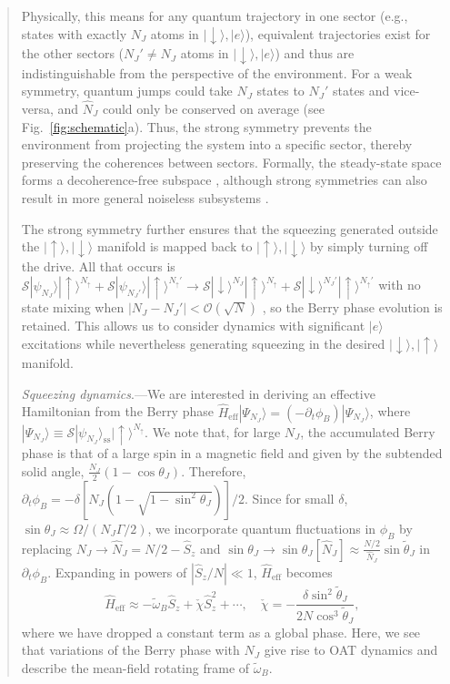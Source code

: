 \begin{abstract}
Physically, this means for any quantum trajectory in one sector (e.g., states with exactly $N_J$ atoms in $|{\downarrow}\rangle, |e\rangle$), equivalent trajectories exist for the other sectors ($N_J' \neq N_J$ atoms in $|{\downarrow}\rangle, |e\rangle$) and thus are indistinguishable from the perspective of the environment. For a weak symmetry, quantum jumps could take $N_J$ states to $N_J'$ states and vice-versa, and $\hat N_J$ could only be conserved on average (see Fig.~\ref{fig:schematic}a). Thus, the strong symmetry prevents the environment from projecting the system into a specific sector, thereby preserving the coherences between sectors. Formally, the steady-state space forms a decoherence-free subspace \cite{Lidar1998}, although strong symmetries can also result in more general noiseless subsystems \cite{Knill2000, Albert2014, Lieu2020}.

The  strong symmetry further ensures that the squeezing generated outside the $|{\uparrow}\rangle ,|{\downarrow} \rangle$ manifold is mapped back to $|{\uparrow}\rangle,|{\downarrow}\rangle$ by simply turning off the drive. 
All that occurs is $\mathcal{S}|\psi_{N_J} \rangle |{\uparrow}\rangle^{N_{\uparrow}} + \mathcal{S}|\psi_{N_J'} \rangle |{\uparrow}\rangle^{N_{\uparrow}'} \to \mathcal{S}|{\downarrow} \rangle^{N_J}|{\uparrow}\rangle^{N_{\uparrow}}+\mathcal{S}|{\downarrow} \rangle^{N_J'}|{\uparrow}\rangle^{N_{\uparrow}'}$ with no state mixing when $|N_J - N_J'| < \mathcal{O}(\sqrt{N})$  \cite{suppcite}, so the Berry phase evolution is retained. 
This allows us to consider dynamics with significant $|e\rangle$ excitations while nevertheless generating squeezing in the desired $|{\downarrow}\rangle, |{\uparrow}\rangle$ manifold.

{\it Squeezing dynamics}.---We are interested in deriving an effective Hamiltonian from the Berry phase $\hat {H}_{\text{eff}} |\Psi_{N_J} \rangle = (-\partial_t  \phi_B) |\Psi_{N_J}\rangle$, where $|\Psi_{N_J} \rangle \equiv \mathcal{S}|\psi_{N_J} \rangle_\text{ss} |{\uparrow}\rangle^{N_{\uparrow}}$.
We note that, for large $N_J$,  the  accumulated  Berry phase is that of a large spin in a magnetic field and  given by the subtended solid angle, $\frac{N_J}{2}(1- \cos \theta_J)$. Therefore,   $\partial_t \phi_B =  -\delta [N_J (1-\sqrt{1-\sin^2 \theta_J})]/2$. Since for small $\delta$, $\sin \theta_J \approx  \Omega/(N_J \Gamma/2)$, we incorporate quantum fluctuations in $\phi_B$ by replacing  $N_J \to \hat{N}_J = N/2 - \hat S_z$  and  $\sin \theta_J \to \sin \theta_J[\hat{N}_J]\approx \frac{N/2}{\hat N_J} \sin \tilde{\theta}_J$ in $\partial_t \phi_B$. 
Expanding in powers of $|\hat S_z/N|\ll 1$, $\hat {H}_{\text{eff}}$ becomes 
\begin{equation}
\label{eq:Heff}
     \hat H_{\text{eff}} \approx  -\tilde{\omega}_B \hat S_z + \check{\chi} \hat S_z^2 + \cdots, \quad \check{\chi} = - \frac{\delta \sin^2 \tilde{\theta}_J}{2 N \cos^3 \tilde{\theta}_J},
\end{equation} where we have dropped a constant term as a global phase. Here, we see that variations of the Berry phase with $N_J$ give rise to OAT dynamics and describe the mean-field rotating frame of $\tilde{\omega}_B$.


\end{abstract}

